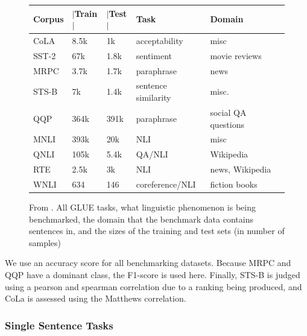 \documentclass[a4paper,12pt,twoside,openright]{report}
\begin{document}
\begin{figure}[H]
\center
\begin{tabular}{
 l %
 l %
 l
 l
 l
 l
}
\toprule
\textbf{Corpus} & \textbf{ $|$Train$|$ } &\textbf{$|$Test$|$} & \textbf{Task} & \textbf{Domain}  \\
\midrule
CoLA  & 8.5k  &  1k   & acceptability &  misc \\

SST-2 & 67k &  1.8k  & sentiment &  movie reviews \\

MRPC & 3.7k &  1.7k & paraphrase & news \\
          
STS-B & 7k &  1.4k    & sentence similarity &  misc. \\
      
QQP & 364k &  391k & paraphrase  &  social QA questions\\	

MNLI & 393k &  20k  & NLI  &  misc \\

QNLI & 105k &  5.4k & QA/NLI &  Wikipedia \\

RTE & 2.5k &  3k      & NLI &  news, Wikipedia \\

WNLI & 634 &  146   & coreference/NLI & fiction books \\

      
\bottomrule
\end{tabular}
\caption{From \cite{wang19}. All GLUE tasks, what linguistic phenomenon is being benchmarked, the domain that the benchmark data contains sentences in, and the sizes of the training and test sets (in number of samples)}
\end{figure}

We use an accuracy score for all benchmarking datasets. Because MRPC and QQP have a dominant class, the F1-score is used here. Finally, STS-B is judged using a pearson and spearman correlation due to a ranking being produced, and CoLa is assessed using the Matthews correlation.

\subsubsection{Single Sentence Tasks}
\end{document}
